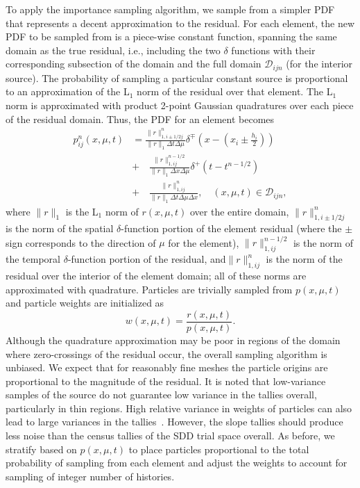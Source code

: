 \documentclass{anstrans}
\newcommand{\ds}[0]{\displaystyle}
\begin{document}
To apply the importance sampling algorithm, we sample from a simpler PDF that represents a decent
approximation to the residual.  For each element, the new PDF to be sampled from is a piece-wise constant function, spanning the
same domain as the true residual, i.e., including the two $\delta$ functions with their
corresponding subsection of the domain and the full domain $\mathcal{D}_{ijn}$ (for the interior
source).  The probability of sampling a particular constant source is proportional
to an approximation of the L$_1$ norm of the residual over that element.  The L$_1$ norm is
approximated with product 2-point Gaussian quadratures over each piece of the residual domain.
Thus, the PDF for an element becomes
\begin{equation}
\begin{array}{cl}
    p_{ij}^n(x,\mu,t) &= \ds \frac{\ds \|r\|_{1,i\pm1/2j}^n}{\ds \|r\|_1\Delta t \Delta \mu}\delta^{\mp}\left(x - (x_{i}
    \pm \frac{\ds h_i}{\ds 2})\right) \\ &+ \quad  \frac{\ds \|r\|_{1,ij}^{n-1/2}}{\ds \|r\|_1\Delta x \Delta
    \mu}\delta^{+}\left(t - t^{n-1/2}\right) \\ &+ \quad  \frac{\ds \|r\|_{1,ij}^n}{\ds \|r\|_1\Delta t \Delta \mu \Delta
    x},\quad  (x,\mu,t) \in \mathcal{D}_{ijn} ,
    \end{array}
\end{equation}
where $\|r\|_1$ is the L$_1$ norm of $r(x,\mu,t)$ over the entire domain,
$\|r\|_{1,i\pm 1/2j}^n$ is the norm of the spatial $\delta$-function portion of the element residual
(where the $\pm$ sign corresponds to the direction of $\mu$ for the element),
$\|r\|_{1,ij}^{n-1/2}$ is
the norm of the temporal $\delta$-function portion of the residual, and$\|r\|_{1,ij}^n$ is the norm
of the residual over the interior of the element domain;
all of these norms are approximated with quadrature. Particles are trivially sampled from $p(x,\mu,t)$ and particle weights are initialized as
\begin{equation}
    w(x,\mu,t) = \frac{r(x,\mu,t)}{p(x,\mu,t)}.
\end{equation}
Although the quadrature
approximation may be poor in regions of the domain where zero-crossings of the residual occur, the
overall sampling algorithm is unbiased.  We expect that for reasonably fine meshes the particle
origins are proportional to the magnitude of the residual.  It is noted that low-variance
samples of the source do not guarantee low variance in the tallies overall, particularly in thin
regions.  High relative variance in weights of particles can also lead to large variances in the
tallies~\cite{shultis_mc}.  However, the slope tallies should produce less noise than the census
tallies of the SDD trial space overall.
As before, we stratify based on $p(x,\mu,t)$ to place particles proportional
to the total probability of sampling from each element and adjust the weights to account for
sampling of integer number of histories.
\end{document}
